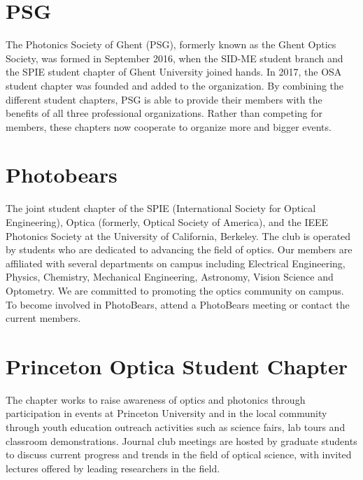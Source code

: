 \documentclass[12pt, a4paper, twocolumn]{article}
\begin{document}

    \twocolumn[
    \begin{@twocolumnfalse}
        \maketitle
        \begin{abstract}
        \abstractText
        \newline
        \end{abstract}
    \end{@twocolumnfalse}
    ]

    \section{PSG}
    The Photonics Society of Ghent (PSG), formerly known as the Ghent Optics Society, was formed in September 2016, when the SID-ME student branch and the SPIE student chapter of Ghent University joined hands.  In 2017, the OSA student chapter was founded and added to the organization.
    By combining the different student chapters, PSG is able to provide their members with the benefits of all three professional organizations.
    Rather than competing for members, these chapters now cooperate to organize more and bigger events.

    \section{Photobears}
    The joint student chapter of the SPIE (International Society for Optical Engineering), Optica (formerly, Optical Society of America), and the IEEE Photonics Society at the University of California, Berkeley.
    The club is operated by students who are dedicated to advancing the field of optics.
    Our members are affiliated with several departments on campus including Electrical Engineering, Physics, Chemistry, Mechanical Engineering, Astronomy, Vision Science and Optometry.
    We are committed to promoting the optics community on campus. To become involved in PhotoBears, attend a PhotoBears meeting or contact the current members.

    \section{Princeton Optica Student Chapter}
    The chapter works to raise awareness of optics and photonics through participation in events at Princeton University and in the local community through youth education outreach activities such as science fairs, lab tours and classroom demonstrations.
    Journal club meetings are hosted by graduate students to discuss current progress and trends in the field of optical science, with invited lectures offered by leading researchers in the field.
\end{document}
